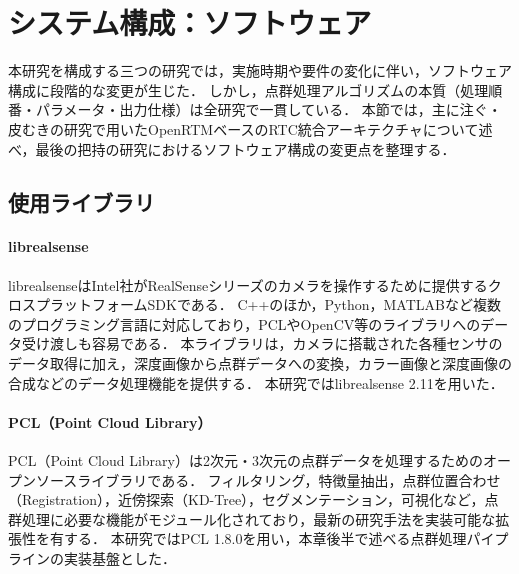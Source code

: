 
\section{システム構成：ソフトウェア}
\label{sec:system:software}

本研究を構成する三つの研究では，実施時期や要件の変化に伴い，ソフトウェア構成に段階的な変更が生じた．
しかし，点群処理アルゴリズムの本質（処理順番・パラメータ・出力仕様）は全研究で一貫している．
本節では，主に注ぐ・皮むきの研究で用いたOpenRTMベースのRTC統合アーキテクチャについて述べ，最後の把持の研究におけるソフトウェア構成の変更点を整理する．

\subsection{使用ライブラリ}
\label{sec:system:software:libraries}

\paragraph{librealsense}

librealsenseはIntel社がRealSenseシリーズのカメラを操作するために提供するクロスプラットフォームSDKである．
C++のほか，Python，MATLABなど複数のプログラミング言語に対応しており，PCLやOpenCV等のライブラリへのデータ受け渡しも容易である．
本ライブラリは，カメラに搭載された各種センサのデータ取得に加え，深度画像から点群データへの変換，カラー画像と深度画像の合成などのデータ処理機能を提供する．
本研究ではlibrealsense 2.11を用いた．

\paragraph{PCL（Point Cloud Library）}

\label{sec:system:software:pcl}

PCL（Point Cloud Library）は2次元・3次元の点群データを処理するためのオープンソースライブラリである\cite{PCL}．
フィルタリング，特徴量抽出，点群位置合わせ（Registration），近傍探索（KD-Tree），セグメンテーション，可視化など，点群処理に必要な機能がモジュール化されており，最新の研究手法を実装可能な拡張性を有する．
本研究ではPCL 1.8.0を用い，本章後半で述べる点群処理パイプラインの実装基盤とした．

